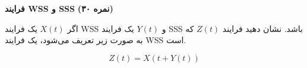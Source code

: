 \Large \textbf{فرایند WSS و SSS}
\large \textbf{(۳۰ نمره)}

\normalsize \vspace{0.5cm}

	اگر
	$X\left( t \right)$
	یک فرایند WSS و
	$Y\left( t \right)$
	یک فرایند SSS باشد. نشان دهید فرایند
	$Z\left( t \right)$
	که به صورت زیر تعریف می‌شود، یک فرایند WSS است.
	
	$$
	Z\left( t \right) = X\left( {t + Y\left( t \right)} \right)
	$$


